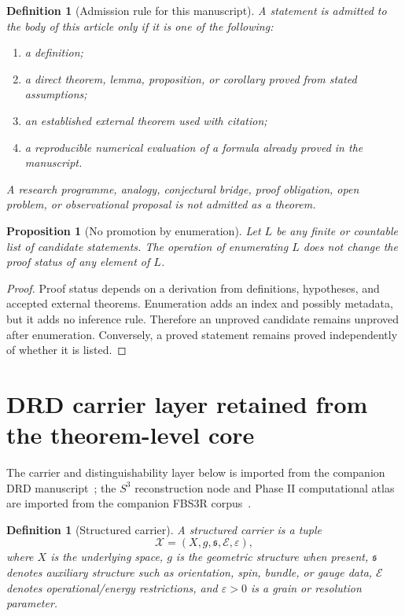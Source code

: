 \documentclass[11pt,a4paper]{article}
\newtheorem{proposition}[theorem]{Proposition}
\newtheorem{definition}[theorem]{Definition}
\begin{document}
\begin{definition}[Admission rule for this manuscript]
A statement is admitted to the body of this article only if it is one of the following:
\begin{enumerate}
\item a definition;
\item a direct theorem, lemma, proposition, or corollary proved from stated assumptions;
\item an established external theorem used with citation;
\item a reproducible numerical evaluation of a formula already proved in the manuscript.
\end{enumerate}
A research programme, analogy, conjectural bridge, proof obligation, open problem, or observational proposal is not admitted as a theorem.
\end{definition}

\begin{proposition}[No promotion by enumeration]
Let $L$ be any finite or countable list of candidate statements.  The operation of enumerating $L$ does not change the proof status of any element of $L$.
\end{proposition}
\begin{proof}
Proof status depends on a derivation from definitions, hypotheses, and accepted external theorems.  Enumeration adds an index and possibly metadata, but it adds no inference rule.  Therefore an unproved candidate remains unproved after enumeration.  Conversely, a proved statement remains proved independently of whether it is listed.\end{proof}

\section{DRD carrier layer retained from the theorem-level core}

The carrier and distinguishability layer below is imported from the companion DRD manuscript~\cite{DRD}; the $S^3$ reconstruction node and Phase II computational atlas are imported from the companion FBS3R corpus~\cite{FBS3RStart,FBS3RQuasi,FBS3RCosmic,PhaseIIAtlas,EquationCore}.

\begin{definition}[Structured carrier]
A structured carrier is a tuple
\[
\mathcal X=(X,g,\mathfrak s,\mathcal E,\varepsilon),
\]
where $X$ is the underlying space, $g$ is the geometric structure when present, $\mathfrak s$ denotes auxiliary structure such as orientation, spin, bundle, or gauge data, $\mathcal E$ denotes operational/energy restrictions, and $\varepsilon>0$ is a grain or resolution parameter.
\end{definition}
\end{document}

